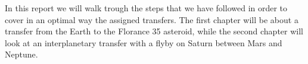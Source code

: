 In this report we will walk trough the steps that we have followed in order to cover in an optimal way the assigned transfers.
The first chapter will be about a transfer from the Earth to the Florance 35 asteroid, while the second chapter will look at an interplanetary transfer with a flyby on Saturn between Mars and Neptune. 
